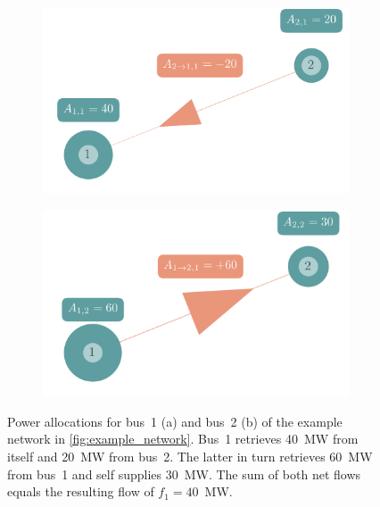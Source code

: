 \documentclass[11pt,twocolumn]{article}
\begin{document}
\begin{figure}[h!]
    \begin{subfigure}[c]{\linewidth}
    \includegraphics[width=\linewidth]{example_allocation_bus1.png}
    \vspace{-40pt}
    \subcaption{}
    \label{fig:example_allocation_bus1}
    \end{subfigure}
    \begin{subfigure}[c]{\linewidth}
    \includegraphics[width=\linewidth]{example_allocation_bus2.png}
    \vspace{-40pt}
    \subcaption{}
    \label{fig:example_allocation_bus2}
    \end{subfigure}
    \caption{Power allocations for bus~1 (a) and bus~2 (b) of the example network in \cref{fig:example_network}. Bus~1 retrieves 40~MW from itself and 20~MW from bus~2. The latter in turn retrieves 60~MW from bus~1 and self supplies 30~MW.
    The sum of both net flows equals the resulting flow of $f_1=40$~MW. \vspace{-20pt}}
    \label{fig:example_allocation}
\end{figure}
\end{document}
